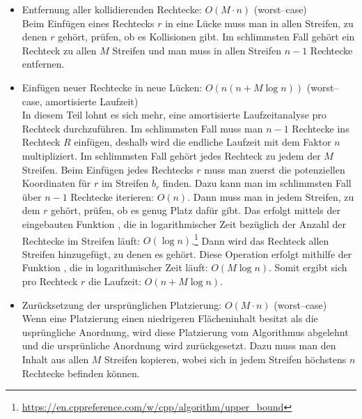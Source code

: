 \begin{itemize}
\begin{itemize}
		\item Entfernung aller kollidierenden Rechtecke: $O(M \cdot n)$ (worst--case)\\
		Beim Einfügen eines Rechtecks $r$ in eine Lücke muss man in allen Streifen, zu denen $r$
		gehört, prüfen, ob es Kollisionen gibt.
		Im schlimmsten Fall gehört ein Rechteck zu allen $M$ Streifen und man muss in allen
		Streifen $n-1$ Rechtecke entfernen.

		\item Einfügen neuer Rechtecke in neue Lücken: $O(n(n + M \log n))$
		(worst--case, amortisierte Laufzeit)\\
		In diesem Teil lohnt es sich mehr, eine amortisierte Laufzeitanalyse pro Rechteck durchzuführen.
		Im schlimmsten Fall muss man $n-1$ Rechtecke ins Rechteck $R$ einfügen, deshalb
		wird die endliche Laufzeit mit dem Faktor $n$ multipliziert.
		Im schlimmsten Fall gehört jedes Rechteck zu jedem der $M$ Streifen.
		Beim Einfügen jedes Rechtecks $r$ muss man zuerst die potenziellen Koordinaten
		für $r$ im Streifen $b_r$ finden.
		Dazu kann man im schlimmsten Fall über $n-1$ Rechtecke iterieren: $O(n)$.
		Dann muss man in jedem Streifen, zu dem $r$ gehört, 
		prüfen, ob es genug Platz dafür gibt.
		Das erfolgt mittels der eingebauten Funktion ,
		die in logarithmischer Zeit bezüglich der Anzahl der Rechtecke im
		Streifen läuft: $O(\log n)$.\footnote{\href{https://en.cppreference.com/w/cpp/algorithm/upper_bound}{https://en.cppreference.com/w/cpp/algorithm/upper\_bound}}
		Dann wird das Rechteck allen Streifen hinzugefügt, zu denen es gehört.
		Diese Operation erfolgt mithilfe der Funktion , die in
		logarithmischer Zeit läuft: $O(M \log n)$.
		Somit ergibt sich pro Rechteck $r$ die Laufzeit: $O(n + M \log n)$.

		\item Zurücksetzung der ursprünglichen Platzierung: $O(M \cdot n)$ (worst--case)\\
		Wenn eine Platzierung einen niedrigeren Flächeninhalt besitzt als 
		die usprüngliche Anordnung, wird diese Platzierung vom Algorithmus abgelehnt
		und die ursprünliche Anordnung wird zurückgesetzt.
		Dazu muss man den Inhalt aus allen $M$ Streifen kopieren, wobei sich in jedem Streifen höchstens 
		$n$ Rechtecke befinden können.
	\end{itemize}

\end{itemize}

